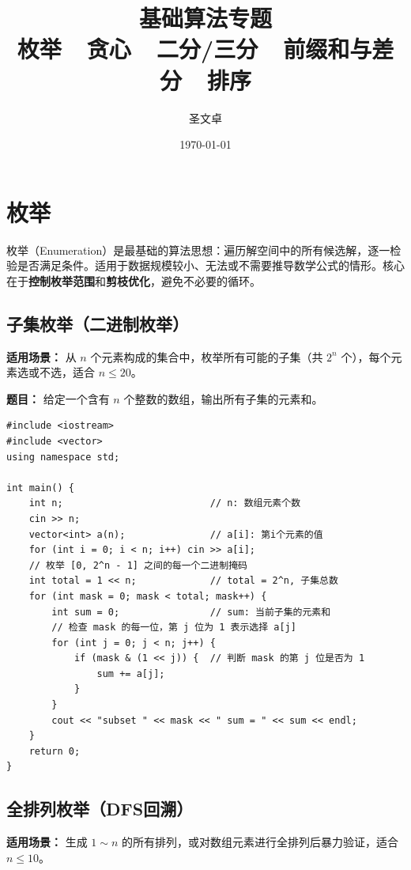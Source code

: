 \documentclass[12pt,a4paper]{ctexart}
\title{基础算法专题\\[5pt]
\large 枚举\ \textbullet\ 贪心\ \textbullet\ 二分/三分\ \textbullet\ 前缀和与差分\ \textbullet\ 排序}
\author{圣文卓}
\date{\today}
\begin{document}
\maketitle
\tableofcontents
\newpage

\section{枚举}
枚举（Enumeration）是最基础的算法思想：遍历解空间中的所有候选解，逐一检验是否满足条件。适用于数据规模较小、无法或不需要推导数学公式的情形。核心在于\textbf{控制枚举范围}和\textbf{剪枝优化}，避免不必要的循环。

\subsection{子集枚举（二进制枚举）}
\textbf{适用场景：} 从 $n$ 个元素构成的集合中，枚举所有可能的子集（共 $2^n$ 个），每个元素选或不选，适合 $n \le 20$。

\textbf{题目：} 给定一个含有 $n$ 个整数的数组，输出所有子集的元素和。

\begin{lstlisting}[caption={二进制枚举所有子集}]
#include <iostream>
#include <vector>
using namespace std;

int main() {
    int n;                          // n: 数组元素个数
    cin >> n;
    vector<int> a(n);               // a[i]: 第i个元素的值
    for (int i = 0; i < n; i++) cin >> a[i];
    // 枚举 [0, 2^n - 1] 之间的每一个二进制掩码
    int total = 1 << n;             // total = 2^n, 子集总数
    for (int mask = 0; mask < total; mask++) {
        int sum = 0;                // sum: 当前子集的元素和
        // 检查 mask 的每一位，第 j 位为 1 表示选择 a[j]
        for (int j = 0; j < n; j++) {
            if (mask & (1 << j)) {  // 判断 mask 的第 j 位是否为 1
                sum += a[j];
            }
        }
        cout << "subset " << mask << " sum = " << sum << endl;
    }
    return 0;
}
\end{lstlisting}

\subsection{全排列枚举（DFS回溯）}
\textbf{适用场景：} 生成 $1 \sim n$ 的所有排列，或对数组元素进行全排列后暴力验证，适合 $n \le 10$。
\end{document}
